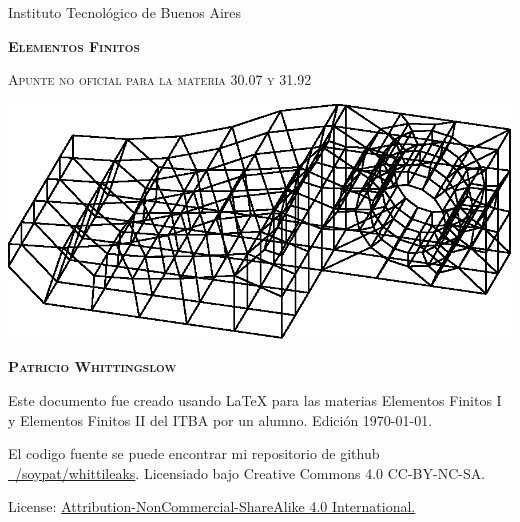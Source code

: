 \documentclass[11pt, a4paper,titlepage]{article}
\begin{document}
	\pagestyle{empty}
\begin{titlepage} %
	
\centering
{Instituto Tecnológico de Buenos Aires \par}
\vspace{2cm}

{\scshape \Huge \bf Elementos Finitos\par}

\vspace{.8cm}

{\scshape\Large Apunte no oficial para la materia 30.07 y 31.92 \par}
\vfill
\vspace{3cm}

{
	\centering
	\includegraphics[width=\textwidth]{fig/sear.eps}
	
}
\vfill

{\scshape\Large\textbf{Patricio Whittingslow} \par}
\vspace{4cm}
\medskip %

\end{titlepage} %
\tableofcontents
\vspace{1cm}
Este documento fue creado usando \LaTeX{} para las materias Elementos Finitos I y Elementos Finitos II del ITBA por un alumno. Edición \today.

El codigo fuente se puede encontrar mi repositorio de github \href{https://github.com/soypat/whittileaks}{~/soypat/whittileaks}. Licensiado bajo Creative Commons 4.0 CC-BY-NC-SA.

License: \href{https://creativecommons.org/licenses/by-nc-sa/4.0/}{Attribution-NonCommercial-ShareAlike 4.0 International.} 

\clearpage
\end{document}
